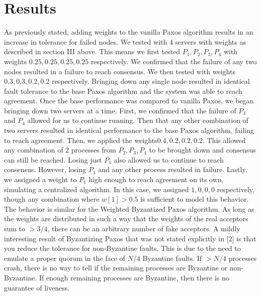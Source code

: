 \documentclass[conference]{IEEEtran}
\begin{document}
\section{Results}
As previously stated, adding weights to the vanilla Paxos algorithm results in an increase in tolerance for failed nodes. We tested with 4 servers with weights as described in section III above. This means we first tested ${P_1, P_2, P_3, P_4}$ with weights ${0.25, 0.25, 0.25, 0.25}$ respectively. We confirmed that the failure of any two nodes resulted in a failure to reach consensus. We then tested with weights ${0.3, 0.3, 0.2, 0.2}$ respectively. Bringing down any single node resulted in identical fault tolerance to the base Paxos algorithm and the system was able to reach agreement.
Once the base performance was compared to vanilla Paxos, we began bringing down two servers at a time. First, we confirmed that the failure of $P_3$ and $P_4$ allowed for us to continue running. Then that any other combination of two servers resulted in identical performance to the base Paxos algorithm, failing to reach agreement.
Then, we applied the weights${0.4, 0.2, 0.2, 0.2}$. This allowed any combination of 2 processes from ${P_2, P_3, P_4}$ to be brought down and consensus can still be reached. Losing just $P_1$ also allowed us to continue to reach consensus. However, losing $P_1$ and any other process resulted in failure.
Lastly, we assigned a weight to $P_1$ high enough to reach agreement on its own, simulating a centralized algorithm. In this case, we assigned ${1, 0, 0, 0}$ respectively, though any combination where $w[1] > 0.5$ is sufficient to model this behavior.
The behavior is similar for the Weighted Byzantized Paxos algorithm. As long as the weights are distributed in such a way that the weights of the real acceptors sum to $> 3/4$, there can be an arbitrary number of fake acceptors.
A mildly interesting result of Byzantizing Paxos that was not stated explicitly in [2] is that you reduce the tolerance for non-Byzantine faults. This is due to the need to emulate a proper quorum in the face of $N/4$ Byzantine faults. If $> N/4$ processes crash, there is no way to tell if the remaining processes are Byzantine or non-Byzantine. If enough remaining processes are Byzantine, then there is no guarantee of liveness.
\end{document}
